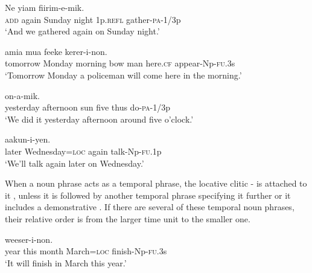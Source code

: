 \ea%
\label{ex:4:x874}
\gll Ne      yiam  fiirim-e-mik. \\
\textsc{add}  again  Sunday  night  1p.\textsc{refl}  gather-\textsc{pa}-1/3p      \\
\glt`And we gathered again on Sunday night.'
\z

\ea%
\label{ex:4:x875}
\gll {}     amia  mua  feeke  kerer-i-non. \\
 tomorrow  Monday  morning  bow  man  here.\textsc{cf}  appear-Np-\textsc{fu}.3s     \\
\glt`Tomorrow Monday a policeman will come here in the morning.'
\z

\ea%
\label{ex:4:x877}
\gll {}      on-a-mik. \\
  yesterday  afternoon  sun  five  thus  do-\textsc{pa}-1/3p    \\
\glt`We did it yesterday afternoon around five o'clock.'
\z

\ea%
\label{ex:4:x876}
\gll {}    aakun-i-yen. \\
  later  Wednesday=\textsc{loc}  again  talk-Np-\textsc{fu}.1p    \\
\glt`We'll talk again later on Wednesday.'
\z

When a noun phrase acts as a temporal phrase, the locative clitic - is attached to it , unless it is followed by another temporal phrase specifying it further or it includes a demonstrative . If there are several of these temporal noun phrases, their relative order is from the larger time unit to the smaller one. 

\ea%
\label{ex:4:x878}
\gll {}     weeser-i-non. \\
   year  this  month  March=\textsc{loc}  finish-Np-\textsc{fu}.3s   \\
\glt`It will finish in March this year.' 
\z

